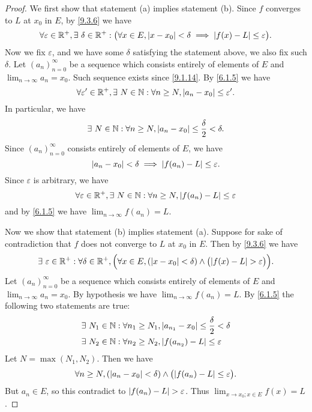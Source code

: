\begin{proof}
  We first show that statement (a) implies statement (b).
  Since \(f\) converges to \(L\) at \(x_0\) in \(E\), by \cref{9.3.6} we have
  \[
    \forall \varepsilon \in \mathbb{R}^+, \exists\ \delta \in \mathbb{R}^+ : \big(\forall x \in E, \left\lvert x - x_0\right\rvert < \delta \implies \left\lvert f(x) - L\right\rvert \leq \varepsilon\big).
  \]
  Now we fix \(\varepsilon\), and we have some \(\delta\) satisfying the statement above, we also fix such \(\delta\).
  Let \((a_n)_{n = 0}^\infty\) be a sequence which consists entirely of elements of \(E\) and \(\lim_{n \to \infty} a_n = x_0\).
  Such sequence exists since \cref{9.1.14}.
  By \cref{6.1.5} we have
  \[
    \forall \varepsilon' \in \mathbb{R}^+, \exists\ N \in \mathbb{N} : \forall n \geq N, \left\lvert a_n - x_0\right\rvert \leq \varepsilon'.
  \]
  In particular, we have
  \[
    \exists\ N \in \mathbb{N} : \forall n \geq N, \left\lvert a_n - x_0\right\rvert \leq \dfrac{\delta}{2} < \delta.
  \]
  Since \((a_n)_{n = 0}^\infty\) consists entirely of elements of \(E\), we have
  \[
    \left\lvert a_n - x_0\right\rvert < \delta \implies \left\lvert f(a_n) - L\right\rvert \leq \varepsilon.
  \]
  Since \(\varepsilon\) is arbitrary, we have
  \[
    \forall \varepsilon \in \mathbb{R}^+, \exists\ N \in \mathbb{N} : \forall n \geq N, \left\lvert f(a_n) - L\right\rvert \leq \varepsilon
  \]
  and by \cref{6.1.5} we have \(\lim_{n \to \infty} f(a_n) = L\).

  Now we show that statement (b) implies statement (a).
  Suppose for sake of contradiction that \(f\) does not converge to \(L\) at \(x_0\) in \(E\).
  Then by \cref{9.3.6} we have
  \[
    \exists\ \varepsilon \in \R^+ : \forall \delta \in \R^+, \Big(\forall x \in E, (\abs{x - x_0} < \delta) \land \big(\abs{f(x) - L} > \varepsilon\big)\Big).
  \]
  Let \((a_n)_{n = 0}^\infty\) be a sequence which consists entirely of elements of \(E\) and \(\lim_{n \to \infty} a_n = x_0\).
  By hypothesis we have \(\lim_{n \to \infty} f(a_n) = L\).
  By \cref{6.1.5} the following two statements are true:
  \begin{align*}
     & \exists\ N_1 \in \mathbb{N} : \forall n_1 \geq N_1, \left\lvert a_{n_1} - x_0\right\rvert \leq \dfrac{\delta}{2} < \delta \\
     & \exists\ N_2 \in \mathbb{N} : \forall n_2 \geq N_2, \left\lvert f(a_{n_2}) - L\right\rvert \leq \varepsilon
  \end{align*}
  Let \(N = \max(N_1, N_2)\).
  Then we have
  \[
    \forall n \geq N, (\abs{a_n - x_0} < \delta) \land \big(\abs{f(a_n) - L} \leq \varepsilon\big).
  \]
  But \(a_n \in E\), so this contradict to \(\left\lvert f(a_n) - L\right\rvert > \varepsilon\).
  Thus \(\lim_{x \to x_0 ; x \in E} f(x) = L\).
\end{proof}


